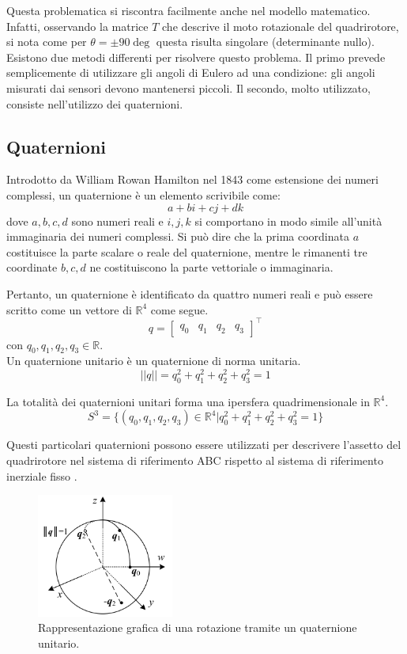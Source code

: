 Questa problematica si riscontra facilmente anche nel modello matematico. Infatti, osservando la matrice $T$ che descrive il moto rotazionale del quadrirotore, si nota come per $\theta = \pm 90 \deg$ questa risulta singolare (determinante nullo).\\

Esistono due metodi differenti per risolvere questo problema. Il primo prevede semplicemente di utilizzare gli angoli di Eulero ad una condizione: gli angoli misurati dai sensori devono mantenersi piccoli. Il secondo, molto utilizzato, consiste nell'utilizzo dei quaternioni.

\subsection{Quaternioni}
Introdotto da William Rowan Hamilton nel 1843 come estensione dei numeri complessi, un quaternione è un elemento scrivibile come:
\[ a + bi + cj + dk \]
dove $a, b, c, d$ sono numeri reali e $i, j, k$ si comportano in modo simile all'unità immaginaria dei numeri complessi. Si può dire che la prima coordinata $a$ costituisce la parte scalare o reale del quaternione, mentre le rimanenti tre coordinate $b, c, d$ ne costituiscono la parte vettoriale o immaginaria.\\

\pagebreak

Pertanto, un quaternione è identificato da quattro numeri reali e può essere scritto come un vettore di $\mathbb{R}^4$ come segue.
\[
q = \begin{bmatrix}
q_0 & q_1 & q_2 & q_3
\end{bmatrix}^\top
\]
con $q_0, q_1, q_2, q_3 \in \mathbb{R}$.\\

Un quaternione unitario è un quaternione di norma unitaria.
\[ || q || = q_0^2 + q_1^2 + q_2^2 + q_3^2 = 1 \]

La totalità dei quaternioni unitari forma una ipersfera quadrimensionale in $\mathbb{R}^4$.
\[ S^3 = \{ (q_0, q_1, q_2, q_3) \in \mathbb{R}^4 | q_0^2 + q_1^2 + q_2^2 + q_3^2 = 1\} \]

 Questi particolari quaternioni possono essere utilizzati per descrivere l'assetto del quadrirotore nel sistema di riferimento \acs{ABC} rispetto al sistema di riferimento inerziale fisso \cite{quatAndRot}.

\begin{figure}[H]
    \centering
    \includegraphics[width=0.4\textwidth]{gfx/quaternion}
    \caption[Rappresentazione grafica di una rotazione tramite un quaternione unitario.]{Rappresentazione grafica di una rotazione tramite un quaternione unitario.}
    \label{fig:quat}
\end{figure}

